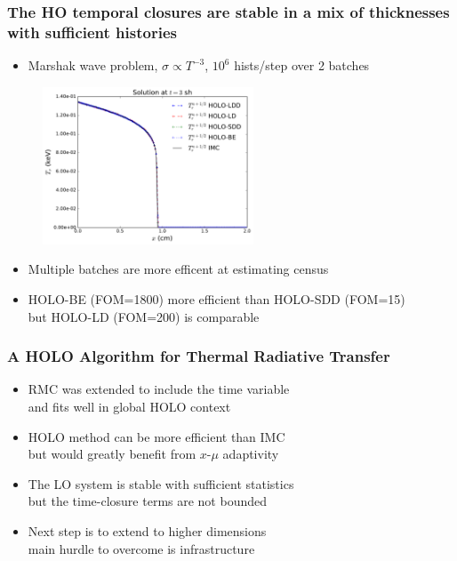 \documentclass[xcolor=dvipsnames,hyperref={pdfpagelabels=false},unknownkeysallowed]{beamer}
\newcommand{\colG}[1]{{\color{Gray!110} #1}}
\newlength{\wideitemsep}
\let\olditem\item
\renewcommand{\item}{\setlength{\itemsep}{\wideitemsep}\olditem}
\newcommand{\shorttitle}{\color{black} A HOLO Algorithm for Thermal Radiative Transfer
    \makebox[\linewidth]{\rule{\textwidth}{5pt}}
}
\begin{document}
\begin{frame}
        \frametitle{The HO temporal closures are stable in a mix of thicknesses \\  with
    sufficient histories}
{\addtolength{\leftmargini}{-0.2in}
    \fontsize{9.0pt}{10.0pt}\selectfont
    \vspace{0.1in}
    \begin{itemize}
        \item Marshak wave problem, $\sigma \propto T^{-3}$, $10^6$ hists/step over 2 batches
    \end{itemize}
            \begin{figure}[H]
    \centering
    \includegraphics[width=0.56\textwidth]{marshak_time_cont_compare.pdf}
\end{figure}
\begin{itemize}
    \item Multiple batches are more efficent at estimating census
    \item HOLO-BE (FOM=1800) more efficient than HOLO-SDD (FOM=15) \\ but HOLO-LD (FOM=200) is comparable
    \end{itemize}
}
\end{frame}

\begin{frame}
    \frametitle{\shorttitle}
    \begin{itemize}
        \item[] RMC was extended to include the time variable\\
            \colG{and fits well in global HOLO context}
        \item[] HOLO method can be more efficient than IMC \\
            \colG{but would greatly benefit from $x$-$\mu$ adaptivity}
        \item[] The LO system is stable with sufficient statistics \\
            \colG{but the time-closure terms are not bounded}
        \item[] Next step is to extend to higher dimensions \\
            \colG{main hurdle to overcome is infrastructure}
    \end{itemize}
\end{frame}
\end{document}
